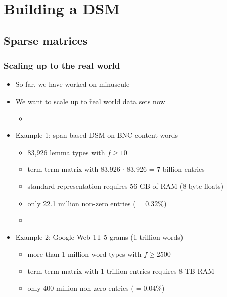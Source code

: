 \documentclass[t]{beamer} %
\begin{document}
\section{Building a DSM}

\subsection{Sparse matrices}

\begin{frame}
  \frametitle{Scaling up to the real world}

  \begin{itemize}
  \item So far, we have worked on minuscule 
  \item[\hand] We want to scale up to \h{real world} data sets now
    \begin{itemize}
    \item[]
    \end{itemize}
  \item<2-> Example 1: span-based DSM on BNC content words
    \begin{itemize}
    \item 83,926 lemma types with $f\geq 10$
    \item term-term matrix with 83,926 $\cdot$ 83,926 = 7 billion entries
    \item standard representation requires 56 GB of RAM (8-byte floats)%
    \item only 22.1 million non-zero entries ($= 0.32\%$)
    \item[]
    \end{itemize}
  \item<3-> Example 2: Google Web 1T 5-grams (1 trillion words)
    \begin{itemize}
    \item more than 1 million word types with $f\geq 2500$
    \item term-term matrix with 1 trillion entries requires 8 TB RAM
    \item only 400 million non-zero entries ($= 0.04\%$)
    \end{itemize}
  \end{itemize}
\end{frame}
\end{document}
